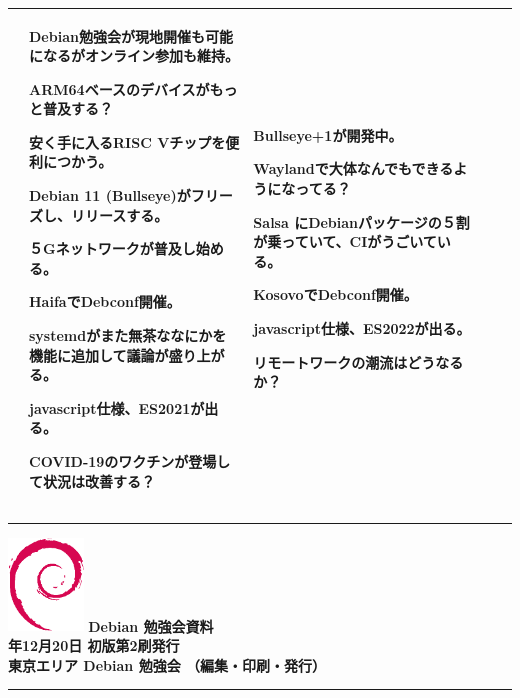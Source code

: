 \documentclass[mingoth,a4paper]{jsarticle}
\newcommand{\debmtgyear}{2020}
\newcommand{\debmtgmonth}{12}
\newcommand{\debmtgdate}{20}
\begin{document}
{\begin{tabular}[t]{|p{8em}|p{8em}|p{8em}|p{8em}|p{8em}|}
&

Debian勉強会が現地開催も可能になるがオンライン参加も維持。

ARM64ベースのデバイスがもっと普及する？

安く手に入るRISC Vチップを便利につかう。

Debian 11 (Bullseye)がフリーズし、リリースする。

５Gネットワークが普及し始める。

HaifaでDebconf開催。

systemdがまた無茶ななにかを機能に追加して議論が盛り上がる。

javascript仕様、ES2021が出る。

COVID-19のワクチンが登場して状況は改善する？

&

Bullseye+1が開発中。

Waylandで大体なんでもできるようになってる？

Salsa にDebianパッケージの５割が乗っていて、CIがうごいている。

KosovoでDebconf開催。

javascript仕様、ES2022が出る。

リモートワークの潮流はどうなるか？

\\

\hline
\end{tabular}
}

\printindex


\vspace*{15cm}
\hrule
\vspace{2mm}
\includegraphics[width=2cm]{image200502/openlogo-nd.eps}
\noindent \Large \bf Debian 勉強会資料\\
\noindent \normalfont \debmtgyear{}年\debmtgmonth{}月\debmtgdate{}日 \hspace{5mm}  初版第2刷発行\\
\noindent \normalfont 東京エリア Debian 勉強会 （編集・印刷・発行）\\
\hrule
\end{document}
